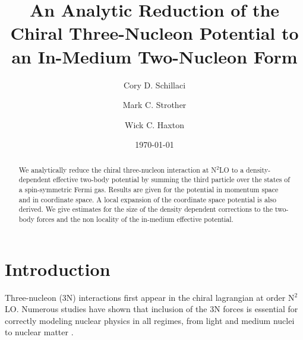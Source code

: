 \documentclass[%
 preprint,
 amsmath,amssymb,
 aps,
]{revtex4-1}
\begin{document}

\title{An Analytic Reduction of the Chiral Three-Nucleon Potential to an In-Medium Two-Nucleon Form}%

\author{Cory D. Schillaci}
\author{Mark C. Strother}
\author{Wick C. Haxton}%
%

\date{\today}%

\begin{abstract}
We analytically reduce the chiral three-nucleon interaction at N$^2$LO to a density-dependent effective two-body potential by summing the third particle over the states of a spin-symmetric Fermi gas. Results are given for the potential in momentum space and in coordinate space. A local expansion of the coordinate space potential is also derived. We give estimates for the size of the density dependent corrections to the two-body forces and the non locality of the in-medium effective potential.
\end{abstract}

\maketitle


\section{\label{sec:level1}Introduction}

Three-nucleon (3N) interactions first appear in the chiral lagrangian at order N$^2$LO. Numerous studies have shown that inclusion of the 3N forces is essential for correctly modeling nuclear physics in all regimes, from light and medium nuclei \cite{PhysRevLett.99.042501,0954-3899-39-8-085111} to nuclear matter \cite{PhysRevC.82.014314,PhysRevC.83.031301}.
\end{document}

